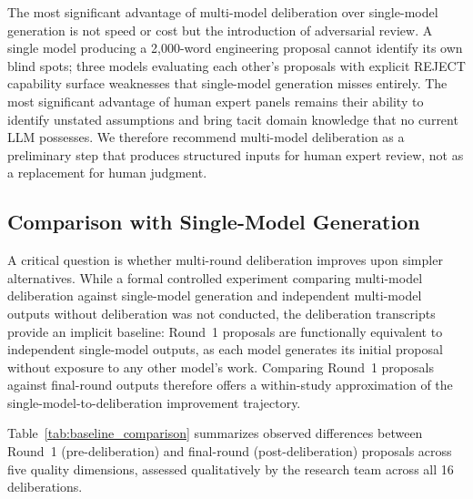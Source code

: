\documentclass[11pt,a4paper]{article}
\begin{document}
The most significant advantage of multi-model deliberation over single-model generation is not speed or cost but the introduction of adversarial review. A single model producing a 2{,}000-word engineering proposal cannot identify its own blind spots; three models evaluating each other's proposals with explicit REJECT capability surface weaknesses that single-model generation misses entirely. The most significant advantage of human expert panels remains their ability to identify unstated assumptions and bring tacit domain knowledge that no current LLM possesses. We therefore recommend multi-model deliberation as a preliminary step that produces structured inputs for human expert review, not as a replacement for human judgment.

\subsection{Comparison with Single-Model Generation}
\label{sec:baseline}

A critical question is whether multi-round deliberation improves upon simpler alternatives. While a formal controlled experiment comparing multi-model deliberation against single-model generation and independent multi-model outputs without deliberation was not conducted, the deliberation transcripts provide an implicit baseline: Round~1 proposals are functionally equivalent to independent single-model outputs, as each model generates its initial proposal without exposure to any other model's work. Comparing Round~1 proposals against final-round outputs therefore offers a within-study approximation of the single-model-to-deliberation improvement trajectory.

Table~\ref{tab:baseline_comparison} summarizes observed differences between Round~1 (pre-deliberation) and final-round (post-deliberation) proposals across five quality dimensions, assessed qualitatively by the research team across all 16 deliberations.
\end{document}
